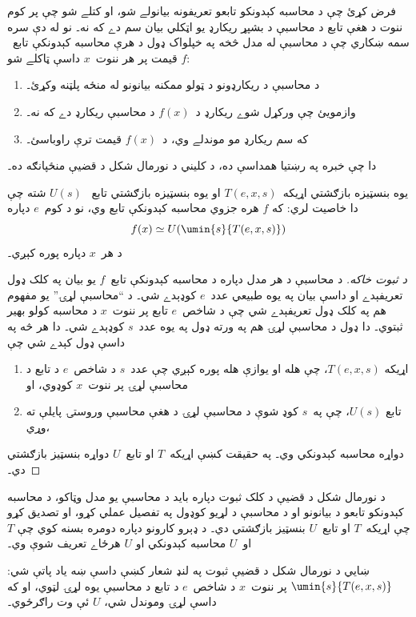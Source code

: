 \documentclass[../../../include/open-logic-section]{subfiles}
\begin{document}

فرض کړئ چې د محاسبه کېدونکو تابعو تعريفونه بيانولے شو، او کتلے شو
چې پر کوم ننوت د هغې تابع د محاسبې د بشپړ ريکارډ يو اټکلي بيان سم دے
که نه۔ نو له دې سره سمه ښکاري چې د محاسبې له مدل څخه په خپلواک ډول د
هرې محاسبه کېدونکې تابع~$f$ قيمت پر هر ننوت~$x$ داسې ټاکلے شو:
\begin{enumerate}
  \item د محاسبې د ريکارډونو د ټولو ممکنه بيانونو له منځه پلټنه وکړئ۔
  \item وازمويئ چې ورکړل شوے ريکارډ د~$f(x)$ د محاسبې ريکارډ دے که نه۔
  \item که سم ريکارډ مو موندلے وي، د~$f(x)$ قيمت ترې راوباسئ۔
\end{enumerate}
دا چې خبره په رښتيا همداسې ده، د کليني د نورمال شکل د قضيې منځپانګه
ده۔

\begin{thm}
يوه بنسټيزه بازګشتي اړيکه~$T(e,x,s)$ او يوه بنسټيزه بازګشتي تابع
~$U(s)$ شته چې دا خاصيت لري: که $f$ هره جزوي محاسبه کېدونکې تابع وي،
نو د کوم~$e$ دپاره
\[
f(x) \simeq U(\umin{s}{T(e, x, s)})
\]
د هر~$x$ دپاره پوره کېږي۔
\end{thm}

\begin{proof}[د ثبوت خاکه]
د محاسبې د هر مدل دپاره د محاسبه کېدونکې تابع~$f$ يو بيان په کلک ډول
تعريفېدے او داسې بيان په يوه طبيعي عدد~$e$ کوډېدے شي۔ د ``محاسبې
لړۍ'' يو مفهوم هم په کلک ډول تعريفېدے شي چې د شاخص~$e$ تابع پر
ننوت~$x$ د محاسبه کولو بهير ثبتوي۔ دا ډول د محاسبې لړۍ هم په ورته ډول
په يوه عدد~$s$ کوډېدے شي۔ دا هر څه په داسې ډول کېدے شي چې
\begin{enumerate}
  \item اړيکه $T(e,x,s)$، چې هله او يوازې هله پوره کېږي چې عدد~$s$ د
  شاخص~$e$ د تابع د محاسبې لړۍ پر ننوت~$x$ کوډوي، او
  \item تابع $U(s)$، چې په~$s$ کوډ شوې د محاسبې لړۍ د هغې محاسبې
  وروستۍ پايلې ته وړي،
\end{enumerate}
دواړه محاسبه کېدونکي وي۔ په حقيقت کښې اړيکه~$T$ او تابع~$U$ دواړه
بنسټيز بازګشتي دي۔
\end{proof}

\begin{explain}
د نورمال شکل د قضيې د کلک ثبوت دپاره بايد د محاسبې يو مدل وټاکو، د
محاسبه کېدونکو تابعو د بيانونو او د محاسبې د لړيو کوډول په تفصيل عملي
کړو، او تصديق کړو چې اړيکه~$T$ او تابع~$U$ بنسټيز بازګشتي دي۔ د ډېرو
کارونو دپاره دومره بسنه کوي چې $T$ او~$U$ محاسبه کېدونکي او $U$
هرځاے تعريف شوې وي۔

ښايي د نورمال شکل د قضيې ثبوت په لنډ شعار کښې داسې ښه ياد پاتې شي:
$\umin{s}{T(e,x,s)}$ پر ننوت~$x$ د شاخص~$e$ د تابع د محاسبې يوه لړۍ
لټوي، او که داسې لړۍ وموندل شي، $U$ ئې وت راګرځوي۔
\end{explain}
\end{document}

